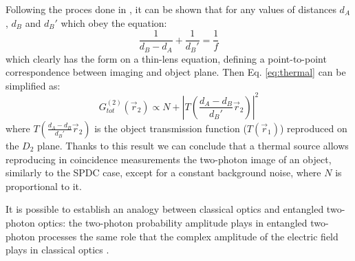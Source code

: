 Following the proces done in \cite{thermalAlejandra}, it can be shown that for any values of distances
$d_A$, $d_B$ and $d_{B}'$ which obey the equation:
\begin{equation}
\frac{1}{d_B - d_A} + \frac{1}{d_{B}'} = \frac{1}{f}
\end{equation}
which clearly has the form on a thin-lens equation, defining a point-to-point correspondence between imaging and object plane.
Then Eq. \ref{eq:thermal} can be simplified as:
\begin{equation}
G^{(2)}_{\textit{tot}}(\vec{r}_2) \propto N + | T \left( \frac{d_A - d_B}{d_{B}'} \vec{r}_2 \right) |^2
\end{equation}
where $T ( \frac{d_A - d_B}{d_{B}'} \vec{r}_2 )$ is the object transmission function ($T(\vec{r}_1)$)
reproduced on the $D_2$ plane. Thanks to this result we can conclude that a thermal source allows reproducing
in coincidence measurements the two-photon image of an object, similarly to the SPDC case, except for a 
constant background noise, where $N$ is proportional to it.


It is possible to establish an analogy
between classical optics and entangled two-photon optics:
the two-photon probability amplitude plays in entangled
two-photon processes the same role that the complex amplitude
of the electric field plays in classical optics  \cite{thermalAlejandra}.